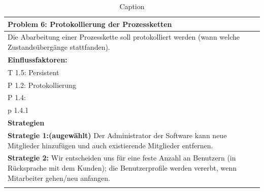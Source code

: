 \documentclass[enabledeprecatedfontcommands,fontsize=12pt,paper=a4,twoside]{scrartcl}
\begin{document}
\begin{table}[H]
    \centering
    \begin{tabular}{|p{15cm}|}
    \hline
          \textbf{Problem 6:} Protokollierung der Prozessketten
          \\ \hline
          Die Abarbeitung einer Prozesskette soll protokolliert werden (wann welche Zustandsübergänge stattfanden).
          \\ \hline
          \textbf{Einflussfaktoren: } \\
          T 1.5: Persistent \\
          P 1.2: Protokollierung\\
          P 1.4:\\
          p 1.4.1\\

          \hline
          \textbf{Strategien} \\ \hline
          \textbf{Strategie 1:(augewählt)} Der Administrator der Software kann neue Mitglieder hinzufügen und auch existierende Mitglieder entfernen. \\
	  \textbf{Strategie 2:} Wir entscheiden uns für eine feste Anzahl an Benutzern (in Rücksprache mit dem Kunden); die Benutzerprofile werden vererbt, wenn Mitarbeiter gehen/neu anfangen. \\
          \\ \hline
    \end{tabular}

    \caption{Caption}
    \label{tab:my_label}
\end{table}


\end{document}
